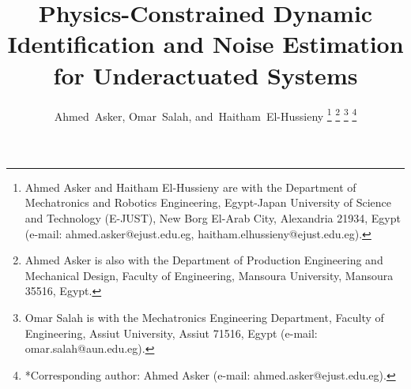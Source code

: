 \documentclass[lettersize,journal]{IEEEtran}
\begin{document}
\title{Physics-Constrained Dynamic Identification and Noise Estimation for Underactuated Systems}

\author{Ahmed~Asker,
        Omar~Salah,
        and~Haitham~El-Hussieny%
\thanks{Ahmed Asker and Haitham El-Hussieny are with the Department of Mechatronics and Robotics Engineering, Egypt-Japan University of Science and Technology (E-JUST), New Borg El-Arab City, Alexandria 21934, Egypt (e-mail: ahmed.asker@ejust.edu.eg, haitham.elhussieny@ejust.edu.eg).}%
\thanks{Ahmed Asker is also with the Department of Production Engineering and Mechanical Design, Faculty of Engineering, Mansoura University, Mansoura 35516, Egypt.}%
\thanks{Omar Salah is with the Mechatronics Engineering Department, Faculty of Engineering, Assiut University, Assiut 71516, Egypt (e-mail: omar.salah@aun.edu.eg).}%
\thanks{*Corresponding author: Ahmed Asker (e-mail: ahmed.asker@ejust.edu.eg).}%
}


\maketitle
\end{document}
